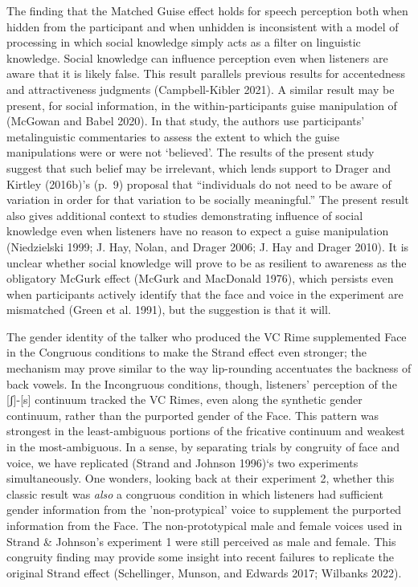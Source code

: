 \documentclass[
  letterpaper,
  DIV=11,
  numbers=noendperiod]{scrartcl}
\begin{document}
The finding that the Matched Guise effect holds for speech perception
both when hidden from the participant and when unhidden is inconsistent
with a model of processing in which social knowledge simply acts as a
filter on linguistic knowledge. Social knowledge can influence
perception even when listeners are aware that it is likely false. This
result parallels previous results for accentedness and attractiveness
judgments (Campbell-Kibler 2021). A similar result may be present, for
social information, in the within-participants guise manipulation of
(McGowan and Babel 2020). In that study, the authors use participants'
metalinguistic commentaries to assess the extent to which the guise
manipulations were or were not `believed'. The results of the present
study suggest that such belief may be irrelevant, which lends support to
Drager and Kirtley (2016b)'s (p.~9) proposal that ``individuals do not
need to be aware of variation in order for that variation to be socially
meaningful.'' The present result also gives additional context to
studies demonstrating influence of social knowledge even when listeners
have no reason to expect a guise manipulation (Niedzielski 1999; J. Hay,
Nolan, and Drager 2006; J. Hay and Drager 2010). It is unclear whether
social knowledge will prove to be as resilient to awareness as the
obligatory McGurk effect (McGurk and MacDonald 1976), which persists
even when participants actively identify that the face and voice in the
experiment are mismatched (Green et al. 1991), but the suggestion is
that it will.

The gender identity of the talker who produced the VC Rime supplemented
Face in the Congruous conditions to make the Strand effect even
stronger; the mechanism may prove similar to the way lip-rounding
accentuates the backness of back vowels. In the Incongruous conditions,
though, listeners' perception of the {[}ʃ{]}-{[}s{]} continuum tracked
the VC Rimes, even along the synthetic gender continuum, rather than the
purported gender of the Face. This pattern was strongest in the
least-ambiguous portions of the fricative continuum and weakest in the
most-ambiguous. In a sense, by separating trials by congruity of face
and voice, we have replicated (Strand and Johnson 1996)`s two
experiments simultaneously. One wonders, looking back at their
experiment 2, whether this classic result was \emph{also} a congruous
condition in which listeners had sufficient gender information from the
'non-protypical' voice to supplement the purported information from the
Face. The non-prototypical male and female voices used in Strand \&
Johnson's experiment 1 were still perceived as male and female. This
congruity finding may provide some insight into recent failures to
replicate the original Strand effect (Schellinger, Munson, and Edwards
2017; Wilbanks 2022).
\end{document}
